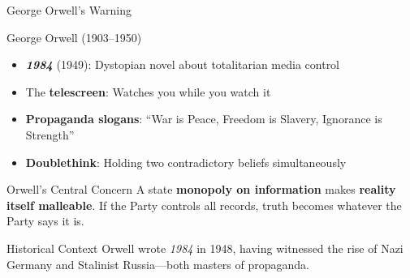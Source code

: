 \documentclass[aspectratio=169,11pt]{beamer}
\begin{document}
\begin{frame}{George Orwell's Warning}
\begin{block}{George Orwell (1903--1950)}
\begin{itemize}
  \item \textbf{\textit{1984}} (1949): Dystopian novel about totalitarian media control
  \item The \textbf{telescreen}: Watches you while you watch it
  \item \textbf{Propaganda slogans}: ``War is Peace, Freedom is Slavery, Ignorance is Strength''
  \item \textbf{Doublethink}: Holding two contradictory beliefs simultaneously
\end{itemize}
\end{block}

\vspace{0.3em}
\begin{alertblock}{Orwell's Central Concern}
A state \textbf{monopoly on information} makes \textbf{reality itself malleable}. If the Party controls all records, truth becomes whatever the Party says it is.
\end{alertblock}

\vspace{0.3em}
\begin{exampleblock}{Historical Context}
Orwell wrote \textit{1984} in 1948, having witnessed the rise of Nazi Germany and Stalinist Russia---both masters of propaganda.
\end{exampleblock}
\end{frame}
\end{document}
